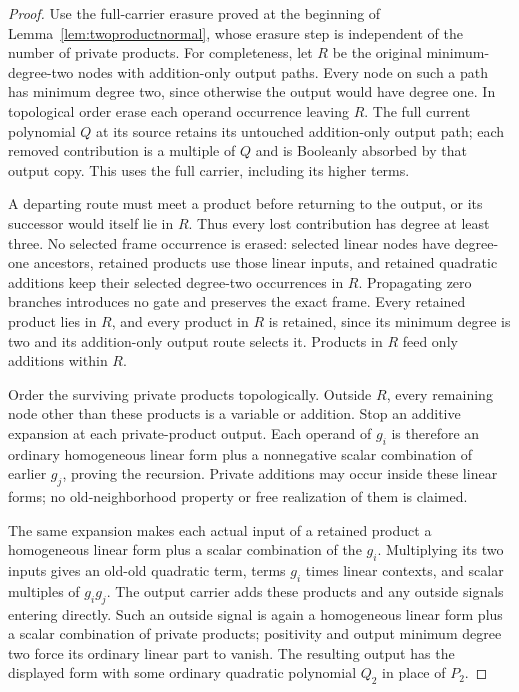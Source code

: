 \documentclass[11pt]{article}
\theoremstyle{definition}
\theoremstyle{remark}
\begin{document}
\begin{proof}
Use the full-carrier erasure proved at the beginning of Lemma~\ref{lem:twoproductnormal}, whose erasure step is independent of the number of private products. For completeness, let $R$ be the original minimum-degree-two nodes with addition-only output paths. Every node on such a path has minimum degree two, since otherwise the output would have degree one. In topological order erase each operand occurrence leaving $R$. The full current polynomial $Q$ at its source retains its untouched addition-only output path; each removed contribution is a multiple of $Q$ and is Booleanly absorbed by that output copy. This uses the full carrier, including its higher terms.

A departing route must meet a product before returning to the output, or its successor would itself lie in $R$. Thus every lost contribution has degree at least three. No selected frame occurrence is erased: selected linear nodes have degree-one ancestors, retained products use those linear inputs, and retained quadratic additions keep their selected degree-two occurrences in $R$. Propagating zero branches introduces no gate and preserves the exact frame. Every retained product lies in $R$, and every product in $R$ is retained, since its minimum degree is two and its addition-only output route selects it. Products in $R$ feed only additions within $R$.

Order the surviving private products topologically. Outside $R$, every remaining node other than these products is a variable or addition. Stop an additive expansion at each private-product output. Each operand of $g_i$ is therefore an ordinary homogeneous linear form plus a nonnegative scalar combination of earlier $g_j$, proving the recursion. Private additions may occur inside these linear forms; no old-neighborhood property or free realization of them is claimed.

The same expansion makes each actual input of a retained product a homogeneous linear form plus a scalar combination of the $g_i$. Multiplying its two inputs gives an old-old quadratic term, terms $g_i$ times linear contexts, and scalar multiples of $g_ig_j$. The output carrier adds these products and any outside signals entering directly. Such an outside signal is again a homogeneous linear form plus a scalar combination of private products; positivity and output minimum degree two force its ordinary linear part to vanish. The resulting output has the displayed form with some ordinary quadratic polynomial $Q_2$ in place of $P_2$.


\end{proof}
\end{document}
